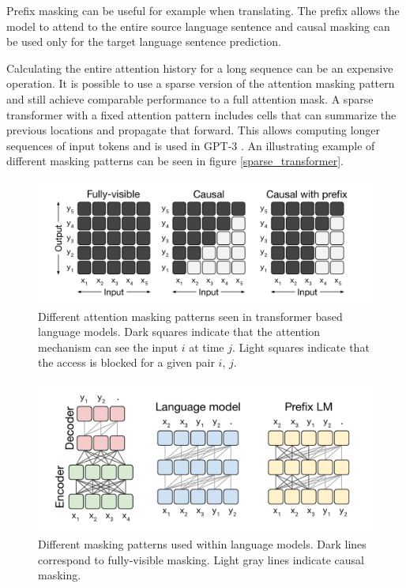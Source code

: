 \documentclass[twoside]{article}
\begin{document}
Prefix masking can be useful for example when translating. The prefix allows the
model to attend to the entire source language sentence and causal masking can be 
used only for the target language sentence prediction. \cite{raffel_exploring_2020}

Calculating the entire attention history for a long sequence can be an expensive operation.
It is possible to use a sparse version of the attention masking pattern and still achieve 
comparable performance to a full attention mask. A sparse transformer with a fixed attention
pattern includes cells that can summarize the previous locations and propagate 
that forward. This allows computing longer sequences of input tokens and is used in GPT-3
\cite{brown_language_2020}. An illustrating example of different masking patterns
can be seen in figure \ref{sparse_transformer}. \cite{child_generating_2019}

\begin{figure}[h]
  \centering
  \includegraphics*[scale=0.15]{img/attention_masking.png}
  \caption{
    Different attention masking patterns seen in transformer based language models.
    Dark squares indicate that the attention mechanism can see the input $i$ at time $j$.
    Light squares indicate that the access is blocked for a given pair $i$, $j$. 
    \cite{raffel_exploring_2020}
  }
\end{figure}
\begin{figure}[h]
  \centering
  \includegraphics*[scale=0.15]{img/lm_masking.png}
  \caption{
    Different masking patterns used within language models. Dark lines correspond to 
    fully-visible masking. Light gray lines indicate causal masking.
    \cite{raffel_exploring_2020}
  }
\end{figure}
\label{masking_patterns}
\end{document}
